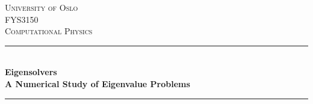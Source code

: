 	\begin{titlepage} %
		\newcommand{\HRule}{\rule{\linewidth}{0.5mm}} %
		
		\center %
		
		
		\textsc{\LARGE University of Oslo}\\[1.5cm] %
		
		\textsc{\Large FYS3150}\\[0.5cm] %
		
		\textsc{\large Computational Physics}\\[0.5cm] %
		
		
		\HRule\\[0.4cm]
		
		{\huge\bfseries Eigensolvers \\ A Numerical Study of Eigenvalue Problems}\\[0.4cm] %
		
		\HRule\\[1.5cm]
		
		
		

\end{titlepage}
